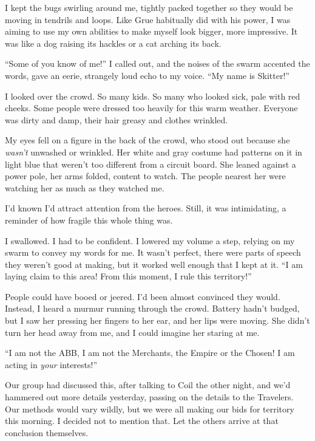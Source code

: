 I kept the bugs swirling around me, tightly packed together so they would be moving in tendrils and loops.  Like Grue habitually did with his power, I was aiming to use my own abilities to make myself look bigger, more impressive.  It was like a dog raising its hackles or a cat arching its back.



``Some of you know of me!'' I called out, and the noises of the swarm accented the words, gave an eerie, strangely loud echo to my voice.  ``My name is Skitter!''



I looked over the crowd.  So many kids.  So many who looked sick, pale with red cheeks.  Some people were dressed too heavily for this warm weather.  Everyone was dirty and damp, their hair greasy and clothes wrinkled.



My eyes fell on a figure in the back of the crowd, who stood out because she \emph{wasn't} unwashed or wrinkled.  Her white and gray costume had patterns on it in light blue that weren't too different from a circuit board.  She leaned against a power pole, her arms folded, content to watch.  The people nearest her were watching her as much as they watched me.



I'd known I'd attract attention from the heroes.  Still, it was intimidating, a reminder of how fragile this whole thing was.



I swallowed.  I had to be confident.  I lowered my volume a step, relying on my swarm to convey my words for me.  It wasn't perfect, there were parts of speech they weren't good at making, but it worked well enough that I kept at it.  ``I am laying claim to this area!  From this moment, I rule this territory!''



People could have booed or jeered.  I'd been almost convinced they would.  Instead, I heard a murmur running through the crowd.  Battery hadn't budged, but I saw her pressing her fingers to her ear, and her lips were moving.  She didn't turn her head away from me, and I could imagine her staring at me.



``I am not the ABB, I am not the Merchants, the Empire or the Chosen!  I am acting in \emph{your} interests!''



Our group had discussed this, after talking to Coil the other night, and we'd hammered out more details yesterday, passing on the details to the Travelers.  Our methods would vary wildly, but we were all making our bids for territory this morning.  I decided not to mention that.  Let the others arrive at that conclusion themselves.



